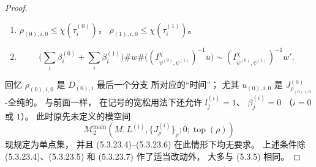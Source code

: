 \begin{proof}
\begin{enumerate}[
 label=\textup{(5.3.23.\arabic*)},
 leftmargin=6.4em]
\[\begin{aligned}
\bigl((\Sigma_{(1),i},\vec z_{(1),i}),
\\
\qquad(u_{(1),i,\alpha}),
(\rho_{(1),i,\alpha})\bigr)
&=
\bigl(
\psi_1^{(1)}
\circ(\psi_{\chi(\tau_i^{(1)})}^{(1)})^{-1}
\circ u
\bigr)(\tau_i^{(1)},1).
\end{aligned}
\]
\item\label{cond:5-3-23-6}
$\rho_{(0),i,0}\le\chi(\tau_i^{(0)})$，
$\rho_{(1),i,0}\le\chi(\tau_i^{(1)})$。
\item\label{cond:5-3-23-7}
\[
\biggl(\sum_i\beta_i^{(0)}
+\sum_i\beta_i^{(1)}\biggr)
\#w\#
\bigl((I^\chi_{\psi^{(0)},\psi^{(1)}})^{-1}u\bigr)
\sim
(I^\chi_{\psi^{(0)},\psi^{(1)}})^{-1}w'.
\]
\end{enumerate}

回忆 $\rho_{(0),i,0}$
是 $D_{(0),i}$ 最后一个分支
所对应的“时间”；
尤其
$u_{(0),i,0}$ 是
$J^{(0)}_{\rho_{(0),i,0}}$-全纯的。
与前面一样，
在记号的宽松用法下还允许
$l_j^{(i)}=1$、
$\beta_j^{(i)}=0$
（$i=0$ 或 $1$）。
此时原先未定义的模空间
\[
\mathcal M^{\mathrm{main}}_2
(M,L^{(i)},\{J^{(i)}_\rho\}_\rho;
0;\operatorname{top}(\rho))
\]
现规定为单点集，
并且 (5.3.23.4)--(5.3.23.6)
在此情形下均无要求。
上述条件除
(5.3.23.4)、(5.3.23.5)
和 (5.3.23.7)
作了适当改动外，
大多与 (5.3.5) 相同。


\end{proof}
